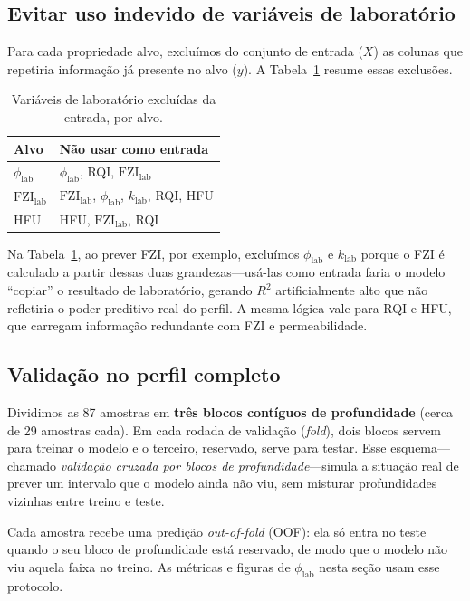 \documentclass[11pt,a4paper]{article}
\newcommand{\philab}{\ensuremath{\phi_{\mathrm{lab}}}}
\newcommand{\fzilab}{\ensuremath{\mathrm{FZI}_{\mathrm{lab}}}}
\newcommand{\klab}{\ensuremath{k_{\mathrm{lab}}}}
\begin{document}
\subsection{Evitar uso indevido de variáveis de laboratório}

Para cada propriedade alvo, excluímos do conjunto de entrada ($X$) as
colunas que repetiria informação já presente no alvo ($y$).
A Tabela~\ref{tab:leakage} resume essas exclusões.

\begin{table}[H]
  \centering
  \caption{Variáveis de laboratório excluídas da entrada, por alvo.}
  \label{tab:leakage}
  \begin{tabular}{ll}
    \toprule
    Alvo & Não usar como entrada \\
    \midrule
    \philab & \philab, RQI, \fzilab \\
    \fzilab & \fzilab, \philab, \klab, RQI, HFU \\
    HFU & HFU, \fzilab, RQI \\
    \bottomrule
  \end{tabular}
\end{table}

Na Tabela~\ref{tab:leakage}, ao prever FZI, por exemplo, excluímos \philab{} e \klab{}
porque o FZI é calculado a partir dessas duas grandezas---usá-las como
entrada faria o modelo ``copiar'' o resultado de laboratório, gerando
$R^2$ artificialmente alto que não refletiria o poder preditivo real do
perfil.
A mesma lógica vale para RQI e HFU, que carregam informação
redundante com FZI e permeabilidade.

\subsection{Validação no perfil completo}

Dividimos as 87 amostras em \textbf{três blocos contíguos de
profundidade} (cerca de 29 amostras cada).
Em cada rodada de validação (\emph{fold}), dois blocos servem para
treinar o modelo e o terceiro, reservado, serve para testar.
Esse esquema---chamado \emph{validação cruzada por blocos de
profundidade}---simula a situação real de prever um intervalo que o
modelo ainda não viu, sem misturar profundidades vizinhas entre treino e
teste.

Cada amostra recebe uma predição \emph{out-of-fold} (OOF): ela só entra
no teste quando o seu bloco de profundidade está reservado, de modo que
o modelo não viu aquela faixa no treino.
As métricas e figuras de \philab{} nesta seção usam esse protocolo.
\end{document}
